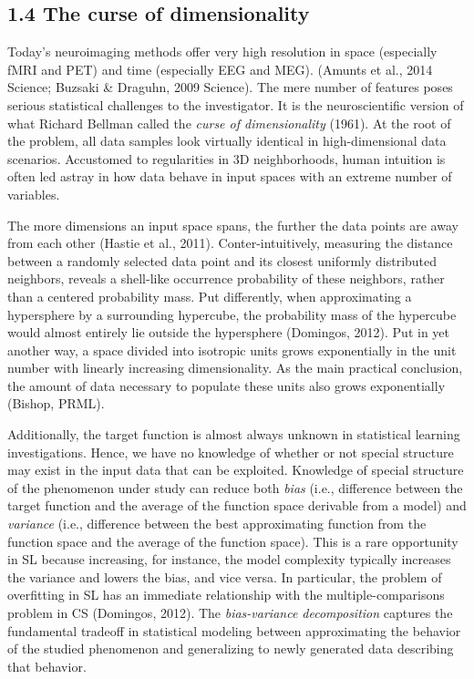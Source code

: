 \documentclass[authoryear,review,3p]{elsarticle}
\begin{document}
\subsection*{1.4 The curse of dimensionality}

Today's neuroimaging methods offer very high resolution in
space (especially fMRI and PET)
and
time (especially EEG and MEG).
(Amunts et al., 2014 Science; Buzsaki \& Draguhn, 2009 Science).
%
The mere number of features poses serious
statistical challenges to the investigator.
It is the neuroscientific version of what Richard Bellman
called the \textit{curse of dimensionality} (1961).
%
At the root of the problem,
all data samples look virtually identical
in high-dimensional data scenarios.
%
Accustomed to regularities in 3D neighborhoods,
human intuition is often led astray in
how data behave in
input spaces with an extreme number of variables.



The more dimensions an input space spans,
the further the data points are away from each other
(Hastie et al., 2011).
Conter-intuitively,
measuring the distance between a randomly selected data point
and its closest uniformly distributed neighbors,
reveals a shell-like occurrence probability of
these neighbors, rather than a centered probability mass.
%
Put differently,
when approximating a hypersphere by a surrounding hypercube,
the probability mass of the hypercube
would almost entirely lie outside the hypersphere
(Domingos, 2012).
%
Put in yet another way,
a space divided into isotropic units grows exponentially in the
unit number with linearly increasing dimensionality.
As the main practical conclusion,
the amount of data necessary to populate these units
also grows exponentially
(Bishop, PRML).



Additionally,
the target function is almost always unknown
in statistical learning investigations.
Hence, we have no knowledge of whether or not
special structure may exist in the input data that can be exploited.
%
Knowledge of special structure of the phenomenon under study
can reduce both \textit{bias}
(i.e., difference between the target function and
the average of the function space derivable from a model)
and
\textit{variance}
(i.e., difference between the best approximating function 
from the function space and
the average of the function space).
This is a rare opportunity in SL because increasing,
for instance, the model complexity
typically increases the variance and lowers the bias, and vice versa.
%
In particular,
the problem of overfitting in SL has an immediate relationship
with the multiple-comparisons problem in CS
(Domingos, 2012).
%
The \textit{bias-variance decomposition} captures the fundamental
tradeoff in statistical modeling between
approximating the behavior of
the studied phenomenon and
generalizing to newly generated data describing that behavior. 
\end{document}

